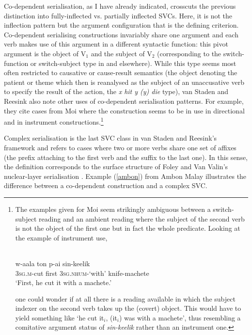 Co-dependent serialisation, as I have already indicated, crosscuts the previous distinction into fully-inflected vs. partially inflected SVCs. Here, it is not the inflection pattern but the argument configuration that is the defining criterion. Co-dependent serialising constructions invariably share one argument and each verb makes use of this argument in a different syntactic function: this pivot argument is the object of V$_1$ and the subject of V$_2$ (corresponding to the switch-function or switch-subject type in \citealt{Aikhenvald2006} and elsewhere). While this type seems most often restricted to causative or cause-result semantics (the object denoting the patient or theme which then is reanalysed as the subject of an unaccusative verb to specify the result of the action, the \textit{x hit y (y) die} type), van Staden and Reesink also note other uses of co-dependent serialisation patterns. For example, they cite cases from Moi where the construction seems to be in use in directional and in instrument constructions.\footnote{The examples given for Moi seem strikingly ambiguous between a switch-subject reading and an ambient reading where the subject of the second verb is not the object of the first one but in fact the whole predicate. Looking at the example of instrument use,

\ea 
{}\\
\gll w-aala ton p-ai sin-keelik \\
\textsc{3}\textsc{sg}.\textsc{m}-cut first \textsc{3}\textsc{sg}.\textsc{nhum}-`with' knife-machete \\
\glft `First, he cut it with a machete.'\\ 
\z

one could wonder if at all there is a reading available in which the subject indexer on the second verb takes up the (covert) object. This would have to yield something like `he cut it$_i$, (it$_i$) was with a machete', thus resembling a comitative argument status of \textit{sin-keelik} rather than an instrument one.}

Complex serialisation is the last SVC class in van Staden and Reesink's framework and refers to cases where two or more verbs share one set of affixes (the prefix attaching to the first verb and the suffix to the last one). In this sense, the definition corresponds to the surface structure of Foley and Van Valin's \citep{foley1984functional} nuclear-layer serialisation \citep[26]{vanstaden2008serial}. Example (\ref{ambon}) from Ambon Malay illustrates the difference between a co-dependent construction and a complex SVC.

